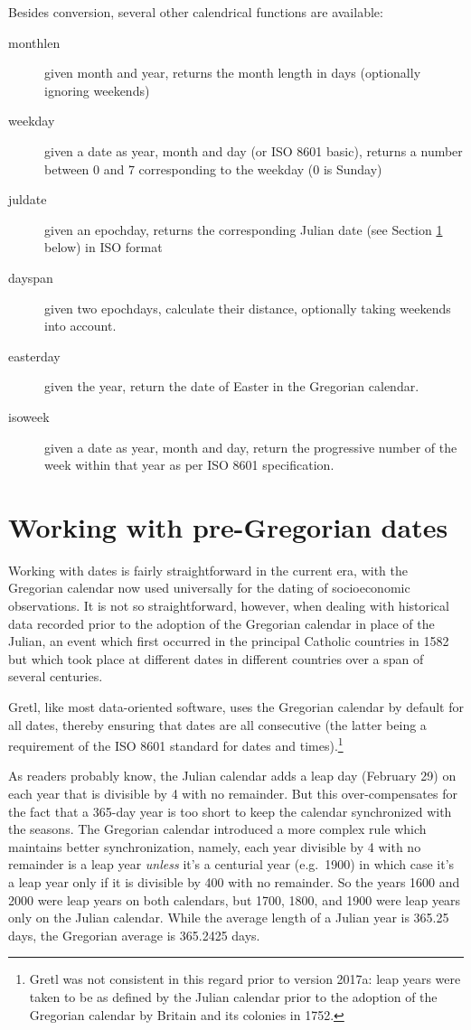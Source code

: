 Besides conversion, several other calendrical functions are available:
\begin{description}
\item[monthlen] given month and year, returns the month length in days
  (optionally ignoring weekends)
\item[weekday] given a date as year, month and day (or ISO 8601
  basic), returns a number between 0 and 7 corresponding to the weekday
  (0 is Sunday)
\item[juldate] given an epochday, returns the corresponding Julian
  date (see Section \ref{sec:cal-conversion} below) in ISO format
\item[dayspan] given two epochdays, calculate their distance,
  optionally taking weekends into account.
\item[easterday] given the year, return the date of Easter in the
  Gregorian calendar.
\item[isoweek] given a date as year, month and day, return the
  progressive number of the week within that year as per ISO 8601
  specification.
\end{description}


\section{Working with pre-Gregorian dates}
\label{sec:cal-conversion}

Working with dates is fairly straightforward in the current era, with
the Gregorian calendar now used universally for the dating of
socioeconomic observations. It is not so straightforward, however,
when dealing with historical data recorded prior to the adoption of
the Gregorian calendar in place of the Julian, an event which first
occurred in the principal Catholic countries in 1582 but which took
place at different dates in different countries over a span of several
centuries.

Gretl, like most data-oriented software, uses the Gregorian calendar
by default for all dates, thereby ensuring that dates are all
consecutive (the latter being a requirement of the ISO 8601 standard
for dates and times).\footnote{Gretl was not consistent in this regard
  prior to version 2017a: leap years were taken to be as defined by
  the Julian calendar prior to the adoption of the Gregorian calendar
  by Britain and its colonies in 1752.}

As readers probably know, the Julian calendar adds a leap day
(February 29) on each year that is divisible by 4 with no
remainder. But this over-compensates for the fact that a 365-day year
is too short to keep the calendar synchronized with the seasons. The
Gregorian calendar introduced a more complex rule which maintains
better synchronization, namely, each year divisible by 4 with no
remainder is a leap year \textit{unless} it's a centurial year (e.g.\
1900) in which case it's a leap year only if it is divisible by 400
with no remainder.  So the years 1600 and 2000 were leap years on both
calendars, but 1700, 1800, and 1900 were leap years only on the Julian
calendar. While the average length of a Julian year is 365.25 days,
the Gregorian average is 365.2425 days. 

